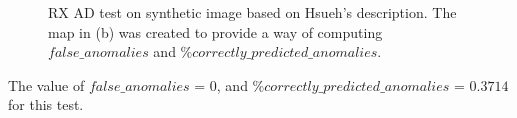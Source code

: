 \begin{figure}[H]
\begin{minipage}[]{.5\linewidth}
\end{minipage}


\caption{RX AD test on synthetic image based on Hsueh's description. The map in (b) was created to provide a way of computing $false\_anomalies$ and $ \%correctly\_predicted\_anomalies$.  }
\label{fig:hsueh_image}
\end{figure}

The value of $false\_anomalies$ = 0, and  $\%correctly\_predicted\_anomalies$ = $0.3714$ for this test.

